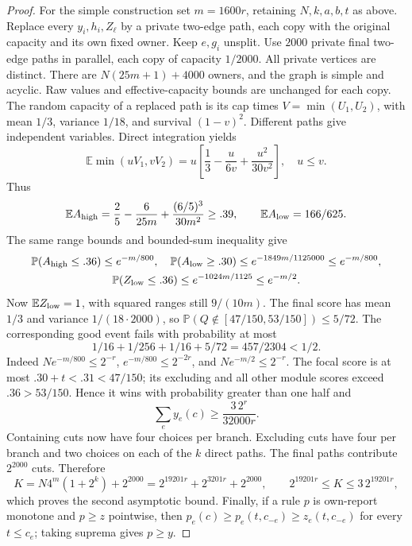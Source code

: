 \documentclass[11pt]{article}
\theoremstyle{definition}\newtheorem{definition}[theorem]{Definition}
\theoremstyle{remark}\newtheorem{remark}[theorem]{Remark}
\newcommand{\E}{\mathbb E}
\newcommand{\Prob}{\mathbb P}
\begin{document}
\begin{proof}
For the simple construction set $m=1600r$, retaining $N,k,a,b,t$ as above.
Replace every $y_i,h_i,Z_\ell$ by a private two-edge path, each copy with
the original capacity and its own fixed owner.  Keep $e,g_i$ unsplit.
Use $2000$ private final two-edge paths in parallel, each copy of capacity
$1/2000$.  All private vertices are distinct.  There are
$N(25m+1)+4000$ owners, and the graph is simple and acyclic.
Raw values and effective-capacity bounds are unchanged for each copy.
The random capacity of a replaced path is its cap times
$V=\min(U_1,U_2)$, with mean $1/3$, variance $1/18$, and survival $(1-v)^2$.
Different paths give independent variables.  Direct integration yields
\[
 \E\min(uV_1,vV_2)=u\left[\frac13-\frac{u}{6v}
                                      +\frac{u^2}{30v^2}\right],\quad u\le v.
\]
Thus
\[
 \E A_{\rm high}=\frac25-\frac6{25m}+\frac{(6/5)^3}{30m^2}
       \ge.39,\qquad \E A_{\rm low}=166/625.
\]
The same range bounds and bounded-sum inequality give
\[
 \begin{gathered}
 \Prob(A_{\rm high}\le.36)\le e^{-m/800},\quad
 \Prob(A_{\rm low}\ge.30)\le e^{-1849m/1125000}\le e^{-m/800},\\
 \Prob(Z_{\rm low}\le.36)\le e^{-1024m/1125}\le e^{-m/2}.
 \end{gathered}
\]
Now $\E Z_{\rm low}=1$, with squared ranges still $9/(10m)$.
The final score has mean $1/3$ and variance $1/(18\cdot2000)$, so
$\Prob(Q\notin[47/150,53/150])\le5/72$.
The corresponding good event fails with probability at most
\[
 1/16+1/256+1/16+5/72=457/2304<1/2.
\]
Indeed $Ne^{-m/800}\le2^{-r}$, $e^{-m/800}\le2^{-2r}$, and
$Ne^{-m/2}\le2^{-r}$.  The focal score is at most
$.30+t<.31<47/150$; its excluding and all other module scores exceed
$.36>53/150$.  Hence it wins with probability greater than one half and
\[
 \sum_ey_e(c)\ge\frac{3\,2^r}{32000r}.
\]
Containing cuts now have four choices per branch.  Excluding cuts have
four per branch and two choices on each of the $k$ direct paths.  The final
paths contribute $2^{2000}$ cuts.  Therefore
\[
 K=N4^m(1+2^k)+2^{2000}
   =2^{19201r}+2^{3201r}+2^{2000},\qquad
 2^{19201r}\le K\le3\,2^{19201r},
\]
which proves the second asymptotic bound.
Finally, if a rule $p$ is own-report monotone and $p\ge z$ pointwise, then
$p_e(c)\ge p_e(t,c_{-e})\ge z_e(t,c_{-e})$ for every $t\le c_e$;
taking suprema gives $p\ge y$.
\end{proof}
\end{document}

